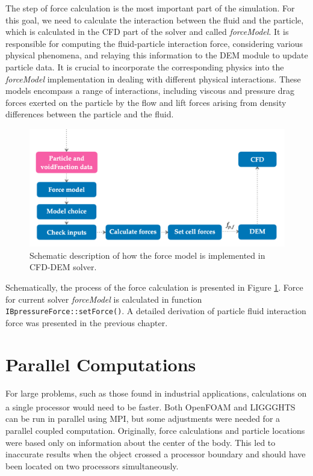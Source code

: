 The step of force calculation is the most important part of the simulation. For this goal, we need to calculate the interaction between the fluid and the particle, which is calculated in the CFD part of the solver and called \textit{forceModel}. It is responsible for computing the fluid-particle interaction force, considering various physical phenomena, and relaying this information to the DEM module to update particle data. It is crucial to incorporate the corresponding physics into the \textit{forceModel} implementation in dealing with different physical interactions. These models encompass a range of interactions, including viscous and pressure drag forces exerted on the particle by the flow and lift forces arising from density differences between the particle and the fluid. 

\begin{figure}[!ht]
    \centering
    \includegraphics[width=15cm]{GWU_Thesis_Sarmakeeva/Images/chap3/force_model.png}
    \caption{Schematic description of how the force model is implemented in CFD-DEM solver.}
    \label{fig:force-model}
\end{figure}
Schematically, the process of the force calculation is presented in Figure \ref{fig:force-model}. Force for current solver \textit{forceModel} is calculated in function \verb|IBpressureForce::setForce()|. A detailed derivation of particle fluid interaction force was presented in the previous chapter. 


\section{Parallel Computations}

For large problems, such as those found in industrial applications, calculations on a single processor would need to be faster. Both OpenFOAM\textsuperscript{\textregistered} and LIGGGHTS\textsuperscript{\textregistered} can be run in parallel using MPI, but some adjustments were needed for a parallel coupled computation. Originally, force calculations and particle locations were based only on information about the center of the body. This led to inaccurate results when the object crossed a processor boundary and should have been located on two processors simultaneously.

